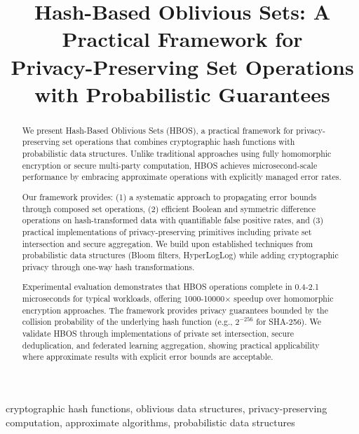 \documentclass[10pt,conference]{IEEEtran}
\begin{document}
\title{Hash-Based Oblivious Sets: A Practical Framework for\\Privacy-Preserving Set Operations with Probabilistic Guarantees}

\author{
}

\maketitle

\begin{abstract}
We present Hash-Based Oblivious Sets (HBOS), a practical framework for privacy-preserving set operations that combines cryptographic hash functions with probabilistic data structures. Unlike traditional approaches using fully homomorphic encryption or secure multi-party computation, HBOS achieves microsecond-scale performance by embracing approximate operations with explicitly managed error rates.

Our framework provides: (1) a systematic approach to propagating error bounds through composed set operations, (2) efficient Boolean and symmetric difference operations on hash-transformed data with quantifiable false positive rates, and (3) practical implementations of privacy-preserving primitives including private set intersection and secure aggregation. We build upon established techniques from probabilistic data structures (Bloom filters, HyperLogLog) while adding cryptographic privacy through one-way hash transformations.

Experimental evaluation demonstrates that HBOS operations complete in 0.4-2.1 microseconds for typical workloads, offering 1000-10000× speedup over homomorphic encryption approaches. The framework provides privacy guarantees bounded by the collision probability of the underlying hash function (e.g., $2^{-256}$ for SHA-256). We validate HBOS through implementations of private set intersection, secure deduplication, and federated learning aggregation, showing practical applicability where approximate results with explicit error bounds are acceptable.
\end{abstract}

\begin{IEEEkeywords}
cryptographic hash functions, oblivious data structures, privacy-preserving computation, approximate algorithms, probabilistic data structures
\end{IEEEkeywords}
\end{document}
